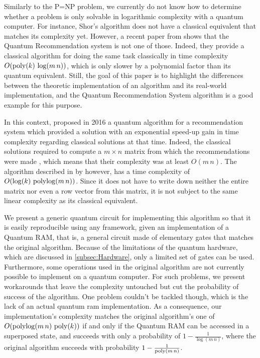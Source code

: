 \documentclass[11pt, a4paper]{article}
\begin{document}
        Similarly to the P=NP problem, we currently do not know how to determine whether a problem is only solvable in logarithmic complexity with a quantum computer. For instance, Shor's algorithm \cite{Shor} does not have a classical equivalent that matches its complexity yet. However, a recent paper from \citeauthor{Dequantized} shows that the Quantum Recommendation system is not one of those. Indeed, they provide a classical algorithm for doing the same task classically in time complexity \(O(\operatorname{poly}(k)\,\log(m\,n))\), which is only slower by a polynomial factor than its quantum equivalent. Still, the goal of this paper is to highlight the differences between the theoretic implementation of an algorithm and its real-world implementation, and the Quantum Recommendation System algorithm is a good example for this purpose.
        
        In this context, \citeauthor{QRS} proposed in 2016 a quantum algorithm for a recommendation system which provided a solution with an exponential speed-up gain in time complexity regarding classical solutions at that time. Indeed, the classical solutions required to compute a \(m\times n\) matrix from which the recommendations were made \cite{Amazon}, which means that their complexity was at least \(O(m\,n)\). The algorithm described in \cite{QRS} by \citeauthor{QRS} however, has a time complexity of \(O(\log(k)\,\operatorname{polylog}(m\,n))\). Since it does not have to write down neither the entire matrix nor even a row vector from this matrix, it is not subject to the same linear complexity as its classical equivalent.
        
        We present a generic quantum circuit for implementing this algorithm so that it is easily reproducible using any framework, given an implementation of a Quantum RAM, that is, a general circuit made of elementary gates that matches the original algorithm. Because of the limitations of the quantum hardware, which are discussed in \autoref{subsec:Hardware}, only a limited set of gates can be used. Furthermore, some operations used in the original algorithm are not currently possible to implement on a quantum computer. For such problems, we present workarounds that leave the complexity untouched but cut the probability of success of the algorithm. One problem couldn't be tackled though, which is the lack of an actual quantum ram implementation. As a consequence, our implementation's complexity matches the original algorithm's one of \(O(\operatorname{polylog}(m\,n)\,\operatorname{poly}(k))\) if and only if the Quantum RAM can be accessed in a superposed state, and succeeds with only a probability of \(1-\frac{1}{\log(m\,n)}\), where the original algorithm succeeds with probability \(1 - \frac{1}{\operatorname{poly}(m\,n)}\).
        
\end{document}
